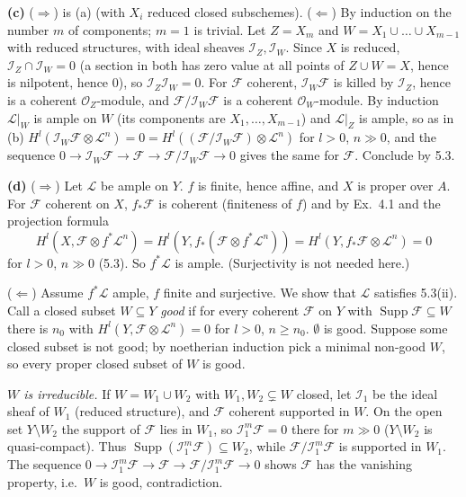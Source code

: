 \documentclass[11pt]{article}
\begin{document}
\textbf{(c)} ($\Rightarrow$) is (a) (with $X_i$ reduced closed subschemes). ($\Leftarrow$) By induction on the number $m$ of components; $m=1$ is trivial. Let $Z=X_m$ and $W=X_1\cup\dots\cup X_{m-1}$ with reduced structures, with ideal sheaves $\mathcal I_Z,\mathcal I_W$. Since $X$ is reduced, $\mathcal I_Z\cap\mathcal I_W=0$ (a section in both has zero value at all points of $Z\cup W=X$, hence is nilpotent, hence $0$), so $\mathcal I_Z\mathcal I_W=0$. For $\mathcal F$ coherent, $\mathcal I_W\mathcal F$ is killed by $\mathcal I_Z$, hence is a coherent $\mathcal O_Z$-module, and $\mathcal F/\mathcal I_W\mathcal F$ is a coherent $\mathcal O_W$-module. By induction $\mathcal L|_W$ is ample on $W$ (its components are $X_1,\dots,X_{m-1}$) and $\mathcal L|_Z$ is ample, so as in (b) $H^l(\mathcal I_W\mathcal F\otimes\mathcal L^n)=0=H^l((\mathcal F/\mathcal I_W\mathcal F)\otimes\mathcal L^n)$ for $l>0$, $n\gg0$, and the sequence $0\to\mathcal I_W\mathcal F\to\mathcal F\to\mathcal F/\mathcal I_W\mathcal F\to0$ gives the same for $\mathcal F$. Conclude by 5.3.

\textbf{(d)} ($\Rightarrow$) Let $\mathcal L$ be ample on $Y$. $f$ is finite, hence affine, and $X$ is proper over $A$. For $\mathcal F$ coherent on $X$, $f_*\mathcal F$ is coherent (finiteness of $f$) and by Ex.~4.1 and the projection formula
\[
H^l(X,\mathcal F\otimes f^*\mathcal L^n)=H^l(Y,f_*(\mathcal F\otimes f^*\mathcal L^n))=H^l(Y,f_*\mathcal F\otimes\mathcal L^n)=0
\]
for $l>0$, $n\gg0$ (5.3). So $f^*\mathcal L$ is ample. (Surjectivity is not needed here.)

($\Leftarrow$) Assume $f^*\mathcal L$ ample, $f$ finite and surjective. We show that $\mathcal L$ satisfies 5.3(ii). Call a closed subset $W\subseteq Y$ \emph{good} if for every coherent $\mathcal F$ on $Y$ with $\operatorname{Supp}\mathcal F\subseteq W$ there is $n_0$ with $H^l(Y,\mathcal F\otimes\mathcal L^n)=0$ for $l>0$, $n\ge n_0$. $\emptyset$ is good. Suppose some closed subset is not good; by noetherian induction pick a minimal non-good $W$, so every proper closed subset of $W$ is good.

\emph{$W$ is irreducible.} If $W=W_1\cup W_2$ with $W_1,W_2\subsetneq W$ closed, let $\mathcal I_1$ be the ideal sheaf of $W_1$ (reduced structure), and $\mathcal F$ coherent supported in $W$. On the open set $Y\setminus W_2$ the support of $\mathcal F$ lies in $W_1$, so $\mathcal I_1^m\mathcal F=0$ there for $m\gg0$ ($Y\setminus W_2$ is quasi-compact). Thus $\operatorname{Supp}(\mathcal I_1^m\mathcal F)\subseteq W_2$, while $\mathcal F/\mathcal I_1^m\mathcal F$ is supported in $W_1$. The sequence $0\to\mathcal I_1^m\mathcal F\to\mathcal F\to\mathcal F/\mathcal I_1^m\mathcal F\to0$ shows $\mathcal F$ has the vanishing property, i.e.\ $W$ is good, contradiction.
\end{document}
